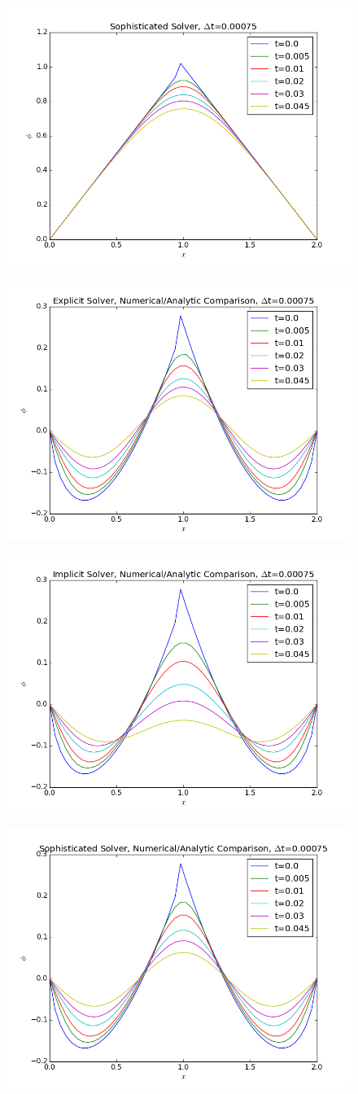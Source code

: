 \documentclass[10pt,letter]{article}
\begin{document}
\begin{figure}[H]
  \centering
    \includegraphics[width=.6\textwidth]{homework7_problem2_plot8}
\end{figure}
\begin{figure}[H]
  \centering
    \includegraphics[width=.6\textwidth]{homework7_problem2_plot9}
\end{figure}
\begin{figure}[H]
  \centering
    \includegraphics[width=.6\textwidth]{homework7_problem2_plot10}
\end{figure}
\begin{figure}[H]
  \centering
    \includegraphics[width=.6\textwidth]{homework7_problem2_plot11}
\end{figure}
\end{document}
